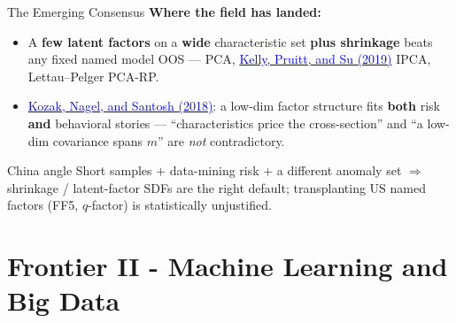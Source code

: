 \documentclass{beamer}
\begin{document}
\begin{frame}{The Emerging Consensus}
\textbf{Where the field has landed:}
\begin{itemize}
\item A \textbf{few latent factors} on a \textbf{wide} characteristic set \textbf{plus shrinkage} beats any fixed named model OOS --- PCA, \href{https://doi.org/10.1016/j.jfineco.2019.05.001}{\textcolor{blue}{Kelly, Pruitt, and Su (2019)}} IPCA, Lettau--Pelger PCA-RP.
\item \href{https://doi.org/10.1111/jofi.12612}{\textcolor{blue}{Kozak, Nagel, and Santosh (2018)}}: a low-dim factor structure fits \textbf{both} risk \textbf{and} behavioral stories --- ``characteristics price the cross-section'' and ``a low-dim covariance spans $m$'' are \textit{not} contradictory.
\end{itemize}
\begin{block}{China angle}
Short samples $+$ data-mining risk $+$ a different anomaly set $\Rightarrow$ shrinkage / latent-factor SDFs are the right default; transplanting US named factors (FF5, $q$-factor) is statistically unjustified.
\end{block}
\end{frame}

\section{Frontier II - Machine Learning and Big Data}
\end{document}
